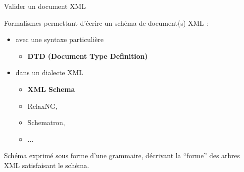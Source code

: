 \begin{frame}{Valider un document XML}

Formalismes permettant d'écrire un schéma de document(s) XML :

\begin{itemize}

\item avec une syntaxe particulière

\begin{itemize}
\item \textbf<4>{DTD (Document Type Definition)} 
\end{itemize}

\item dans un dialecte XML

\begin{itemize}
\item \textbf<4>{XML Schema} 
\item RelaxNG, 
\item Schematron,
\item ...
\end{itemize}

\end{itemize}

Schéma exprimé sous forme d'une grammaire, décrivant la ``forme'' des arbres XML satisfaisant le schéma.

\end{frame}



